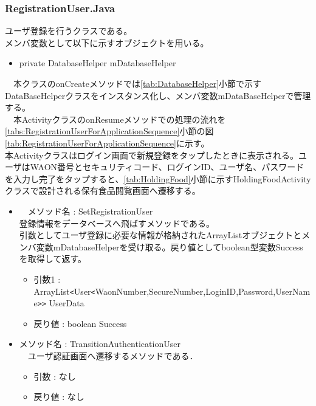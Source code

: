 \documentclass[a4j]{jarticle}
\begin{document}
\subsubsection{RegistrationUser.Java}
\label{tab:Registration}
ユーザ登録を行うクラスである。\\
メンバ変数として以下に示すオブジェクトを用いる。
\begin{itemize}
\item private DatabaseHelper mDatabaseHelper
\end{itemize}
　本クラスのonCreateメソッドでは\ref{tab:DatabaseHelper}小節で示すDataBaseHelperクラスをインスタンス化し、メンバ変数mDataBaseHelperで管理する。\\
　本ActivityクラスのonResumeメソッドでの処理の流れを\ref{tabs:RegistrationUserForApplicationSequence}小節の図\ref{tab:RegistrationUserForApplicationSequence}に示す。\\
本Activityクラスはログイン画面で新規登録をタップしたときに表示される。ユーザはWAON番号とセキュリティコード、ログインID、ユーザ名、パスワードを入力し完了をタップすると、\ref{tab:HoldingFood}小節に示すHoldingFoodActivityクラスで設計される保有食品閲覧画面へ遷移する。
\begin{itemize}
\item　メソッド名 : SetRegistrationUser\\
  登録情報をデータベースへ飛ばすメソッドである。\\
  引数としてユーザ登録に必要な情報が格納されたArrayListオブジェクトとメンバ変数mDatabaseHelperを受け取る。戻り値としてboolean型変数Successを取得して返す。
  \begin{itemize}
  \item 引数1 : ArrayList\verb|<|User\verb|<|WaonNumber,SecureNumber,LoginID,Password,UserName\verb|>>| UserData
  \item 戻り値 : boolean Success
  \end{itemize}
 \item メソッド名 : TransitionAuthenticationUser\\
 　ユーザ認証画面へ遷移するメソッドである．\\
 \begin{itemize}
   \item 引数 : なし
   \item 戻り値 : なし
 \end{itemize}
\end{itemize}
\end{document}
